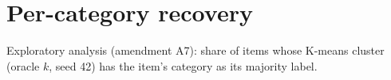 \section{Per-category recovery}\label{app:categories}
Exploratory analysis (amendment A7): share of items whose K-means cluster (oracle $k$, seed 42) has the item's category as its majority label.

\begin{table}[H]
\centering
\caption{Per-category recovery on real repairs (full cohorts).}\label{tab:cat-real}
\small
{}
\end{table}

\begin{table}[H]
\centering
\caption{Per-category recovery on injected mutants (test cohorts).}\label{tab:cat-injected}
\small
{}
\end{table}
